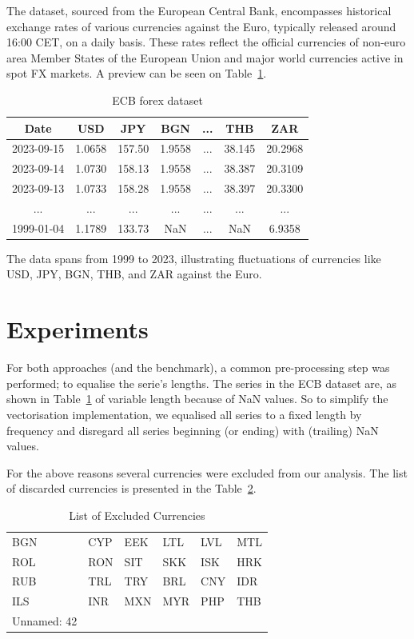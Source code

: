 \documentclass[conference]{IEEEtran}
\begin{document}
The dataset, sourced from the European Central Bank\cite{ecb}, encompasses historical exchange rates of various currencies against the Euro, typically released around 16:00 CET, on a daily basis. These rates reflect the official currencies of non-euro area Member States of the European Union and major world currencies active in spot FX markets. A preview can be seen on Table~\ref{tab:data}. 
\begin{table}[h]
\centering
\caption{ECB forex dataset}\label{tab:data}
\begin{tabular}{ccccccc}
\toprule
\textbf{Date} & \textbf{USD} & \textbf{JPY} & \textbf{BGN} & \textbf{...} & \textbf{THB} & \textbf{ZAR} \\
\midrule
2023-09-15 & 1.0658 & 157.50 & 1.9558 & ... & 38.145 & 20.2968 \\
2023-09-14 & 1.0730 & 158.13 & 1.9558 & ... & 38.387 & 20.3109 \\
2023-09-13 & 1.0733 & 158.28 & 1.9558 & ... & 38.397 & 20.3300 \\
... & ... & ... & ... & ... & ... & ... \\
1999-01-04 & 1.1789 & 133.73 & NaN & ... & NaN & 6.9358 \\
\bottomrule
\end{tabular}
\end{table}
The data spans from 1999 to 2023, illustrating fluctuations of currencies like USD, JPY, BGN, THB, and ZAR against the Euro.

\section{Experiments}

For both approaches (and the benchmark), a common pre-processing step was performed; to equalise the serie's lengths. The series in the ECB dataset are, as shown in Table~\ref{tab:data} of variable length because of NaN values. So to simplify the vectorisation implementation, we equalised all series to a fixed length by frequency and disregard all series beginning (or ending) with (trailing) NaN values.

For the above reasons several currencies were excluded from our analysis. The list of discarded currencies is presented in the Table~\ref{tab:excluded_currencies}.

\begin{table}[h]
\centering
\caption{List of Excluded Currencies}
\label{tab:excluded_currencies}
\begin{tabular}{llllll}
\toprule
BGN & CYP & EEK & LTL & LVL & MTL \\
ROL & RON & SIT & SKK & ISK & HRK \\
RUB & TRL & TRY & BRL & CNY & IDR \\
ILS & INR & MXN & MYR & PHP & THB \\
Unnamed: 42 & & & & & \\
\bottomrule
\end{tabular}
\end{table}
\end{document}
